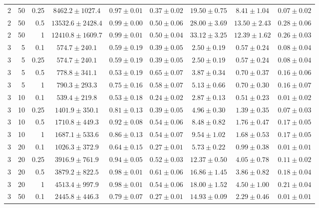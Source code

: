 \begin{table}[htbp]
\begin{tabular}{@{}rrrcccccc@{}}
2 & 50 & 0.25 & $8462.2 \pm 1027.4$ & $0.97 \pm 0.01$ & $0.37 \pm 0.02$ & $19.50 \pm 0.75$ & $8.41 \pm 1.04$ & $0.07 \pm 0.02$ \\
2 & 50 & 0.5 & $13532.6 \pm 2428.4$ & $0.99 \pm 0.00$ & $0.50 \pm 0.06$ & $28.00 \pm 3.69$ & $13.50 \pm 2.43$ & $0.28 \pm 0.06$ \\
2 & 50 & 1 & $12410.8 \pm 1609.7$ & $0.99 \pm 0.01$ & $0.50 \pm 0.04$ & $33.12 \pm 3.25$ & $12.39 \pm 1.62$ & $0.26 \pm 0.03$ \\
\midrule
3 & 5 & 0.1 & $574.7 \pm 240.1$ & $0.59 \pm 0.19$ & $0.39 \pm 0.05$ & $2.50 \pm 0.19$ & $0.57 \pm 0.24$ & $0.08 \pm 0.04$ \\
3 & 5 & 0.25 & $574.7 \pm 240.1$ & $0.59 \pm 0.19$ & $0.39 \pm 0.05$ & $2.50 \pm 0.19$ & $0.57 \pm 0.24$ & $0.08 \pm 0.04$ \\
3 & 5 & 0.5 & $778.8 \pm 341.1$ & $0.53 \pm 0.19$ & $0.65 \pm 0.07$ & $3.87 \pm 0.34$ & $0.70 \pm 0.37$ & $0.16 \pm 0.06$ \\
3 & 5 & 1 & $790.3 \pm 293.3$ & $0.75 \pm 0.16$ & $0.58 \pm 0.07$ & $5.13 \pm 0.66$ & $0.70 \pm 0.30$ & $0.16 \pm 0.07$ \\
3 & 10 & 0.1 & $539.4 \pm 219.8$ & $0.53 \pm 0.18$ & $0.24 \pm 0.02$ & $2.87 \pm 0.13$ & $0.51 \pm 0.23$ & $0.01 \pm 0.02$ \\
3 & 10 & 0.25 & $1401.9 \pm 350.1$ & $0.81 \pm 0.13$ & $0.39 \pm 0.05$ & $4.96 \pm 0.30$ & $1.39 \pm 0.35$ & $0.07 \pm 0.03$ \\
3 & 10 & 0.5 & $1710.8 \pm 449.3$ & $0.92 \pm 0.08$ & $0.54 \pm 0.06$ & $8.48 \pm 0.82$ & $1.76 \pm 0.47$ & $0.17 \pm 0.05$ \\
3 & 10 & 1 & $1687.1 \pm 533.6$ & $0.86 \pm 0.13$ & $0.54 \pm 0.07$ & $9.54 \pm 1.02$ & $1.68 \pm 0.53$ & $0.17 \pm 0.05$ \\
3 & 20 & 0.1 & $1026.3 \pm 372.9$ & $0.64 \pm 0.15$ & $0.27 \pm 0.01$ & $5.73 \pm 0.22$ & $0.99 \pm 0.38$ & $0.01 \pm 0.01$ \\
3 & 20 & 0.25 & $3916.9 \pm 761.9$ & $0.94 \pm 0.05$ & $0.52 \pm 0.03$ & $12.37 \pm 0.50$ & $4.05 \pm 0.78$ & $0.11 \pm 0.02$ \\
3 & 20 & 0.5 & $3879.2 \pm 822.5$ & $0.98 \pm 0.01$ & $0.61 \pm 0.06$ & $16.86 \pm 1.45$ & $3.86 \pm 0.82$ & $0.18 \pm 0.04$ \\
3 & 20 & 1 & $4513.4 \pm 997.9$ & $0.98 \pm 0.01$ & $0.54 \pm 0.06$ & $18.00 \pm 1.52$ & $4.50 \pm 1.00$ & $0.21 \pm 0.04$ \\
3 & 50 & 0.1 & $2445.8 \pm 446.3$ & $0.79 \pm 0.07$ & $0.27 \pm 0.01$ & $14.93 \pm 0.09$ & $2.29 \pm 0.46$ & $0.01 \pm 0.01$ \\

\end{tabular}
\end{table}
